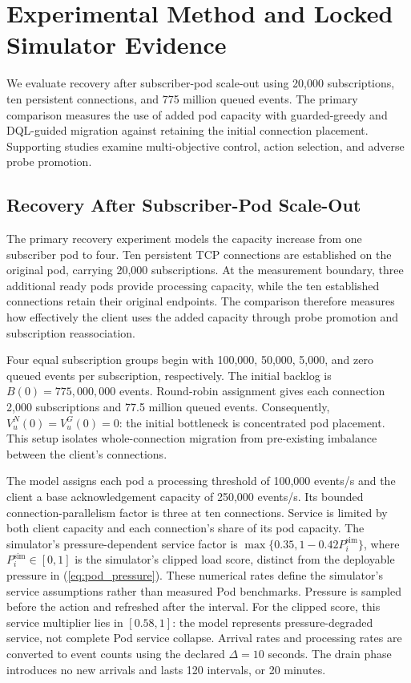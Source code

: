 \section{Experimental Method and Locked Simulator Evidence}
\label{sec:locked-evidence}

We evaluate recovery after subscriber-pod scale-out using 20,000 subscriptions,
ten persistent connections, and 775 million queued events. The primary
comparison measures the use of added pod capacity with guarded-greedy and
DQL-guided migration against retaining the initial connection placement. Supporting studies examine
multi-objective control, action selection, and adverse probe promotion.

\subsection{Recovery After Subscriber-Pod Scale-Out}
\label{sec:scaleout-recovery}

The primary recovery experiment models the capacity increase from one
subscriber pod to four. Ten persistent TCP connections are established on the
original pod, carrying 20,000 subscriptions. At the measurement boundary,
three additional ready pods provide processing capacity, while the ten
established connections retain their original endpoints. The comparison
therefore measures how effectively the client uses the added capacity through
probe promotion and subscription reassociation.

Four equal subscription groups begin with 100,000, 50,000, 5,000, and zero
queued events per subscription, respectively. The initial backlog is
$B(0)=775{,}000{,}000$ events. Round-robin assignment gives each connection
2,000 subscriptions and 77.5 million queued events. Consequently,
$V^N_u(0)=V^G_u(0)=0$: the initial bottleneck is concentrated pod placement.
This setup isolates whole-connection migration from pre-existing imbalance
between the client's connections.

The model assigns each pod a processing threshold of 100,000 events/s and
the client a base acknowledgement capacity of 250,000 events/s. Its bounded
connection-parallelism factor is three at ten connections. Service is limited
by both client capacity and each connection's share of its pod capacity.
The simulator's pressure-dependent service factor is
$\max\{0.35,1-0.42P_i^{\mathrm{sim}}\}$, where $P_i^{\mathrm{sim}}\in[0,1]$ is the simulator's
clipped load score, distinct from the deployable pressure in
(\ref{eq:pod_pressure}). These numerical rates define the simulator's service
assumptions rather than measured Pod benchmarks. Pressure is sampled before the action
and refreshed after the interval. For the clipped score, this service
multiplier lies in $[0.58,1]$: the model represents pressure-degraded service,
not complete Pod service collapse. Arrival rates and processing rates are
converted to event counts using the declared $\Delta=10$ seconds. The drain
phase introduces no new arrivals and lasts 120 intervals, or 20 minutes.

